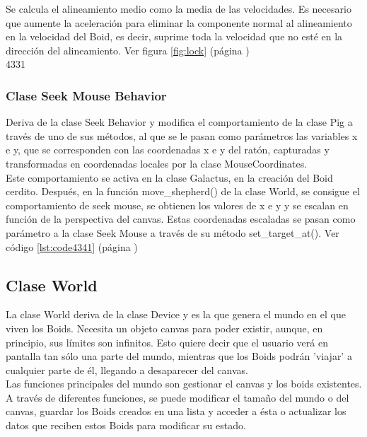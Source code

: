 Se calcula el alineamiento medio como la media de las velocidades. Es necesario que aumente la aceleración para eliminar la componente 
normal al alineamiento en la velocidad del Boid, es decir, suprime toda la velocidad que no esté en la dirección del alineamiento.  
Ver figura \ref{fig:lock} (página \pageref{fig:lock})\\ 4331



\subsubsection{Clase Seek Mouse Behavior}
\label{subsubsection:seek_mouse_behavior}

Deriva de la clase Seek Behavior y modifica el comportamiento de la clase Pig a través de uno de sus métodos, al que se le pasan 
como parámetros las variables x e y, que se corresponden  con las coordenadas x e y del ratón, capturadas y transformadas en coordenadas 
locales por la clase MouseCoordinates.\\

Este comportamiento se activa en la clase Galactus, en la creación del Boid cerdito. Después, en la función move\_shepherd() de la clase 
World, se consigue el comportamiento de seek mouse, se obtienen los valores de x e y y se escalan en función de la perspectiva del canvas.
Estas coordenadas escaladas se pasan como parámetro a la clase Seek Mouse a través de su método  set\_target\_at(). 
Ver código \ref{lst:code4341} (página \pageref{lst:code4341})\\



\subsection{Clase World}
\label{subsection:world}

La clase World deriva de la clase Device y es la que genera el mundo en el que viven los Boids. Necesita un objeto canvas para poder 
existir, aunque, en principio, sus límites son infinitos. Esto quiere decir que el usuario verá en pantalla tan sólo una parte del mundo, 
mientras que los Boids podrán 'viajar' a cualquier parte de él, llegando a desaparecer del canvas.\\

Las funciones principales del mundo son gestionar el canvas y los boids existentes. A través de diferentes funciones, se puede modificar 
el tamaño del mundo o del canvas, guardar los Boids creados en una lista y acceder a ésta o actualizar los datos que reciben estos Boids 
para modificar su estado.\\

